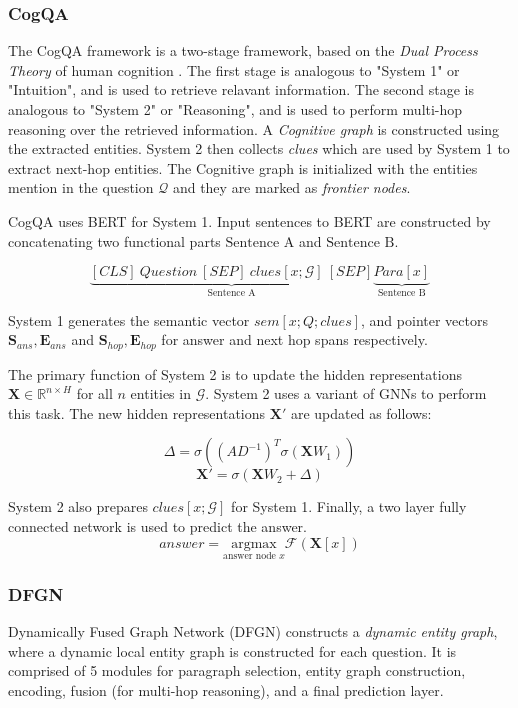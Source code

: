 \documentclass[sigplan,screen]{acmart}
\begin{document}
\subsubsection{CogQA}
The CogQA framework \cite{RN118} is a two-stage framework, based on the \emph{Dual Process Theory} of human cognition \cite{RN137}.
The first stage is analogous to "System 1" or "Intuition", and is used to retrieve relavant information. The second stage is analogous to
"System 2" or "Reasoning", and is used to perform multi-hop reasoning over the retrieved information. A \emph{Cognitive graph} is constructed
using the extracted entities. System 2 then collects \emph{clues} which are used by System 1 to extract next-hop entities.
The Cognitive graph is initialized with the entities mention in the question $\mathcal{Q}$ and they are marked as \emph{frontier nodes}.

CogQA uses BERT \cite{RN153} for System 1. Input sentences to BERT are constructed by concatenating two functional parts 
$\text{Sentence A}$ and $\text{Sentence B}$.

$$
\underbrace{{[CLS]\: Question \: [SEP]\: clues[x; \mathcal{G}]\: [SEP]}}_{\text{Sentence A}} \underbrace{{Para[x]}}_{\text{Sentence B}}
$$

System 1 generates the semantic vector $sem[x; Q; clues]$, and pointer vectors 
$\boldsymbol{S}_{ans} , \boldsymbol{E}_{ans} $ and $\boldsymbol{S}_{hop} , \boldsymbol{E}_{hop} $ for answer and next hop spans respectively.

The primary function of System 2 is to update the hidden representations $\boldsymbol{X} \in \mathbb{R}^{n \times H}$ for all $n$ entities 
in $\mathcal{G}$. System 2 uses a variant of GNNs \cite{RN2} to perform this task. The new hidden representations $\boldsymbol{X'}$ are updated 
as follows:

$$
\Delta = \sigma((AD^{-1})^T \sigma (\boldsymbol{X}W_1))
$$
$$
\boldsymbol{X'} = \sigma(\boldsymbol{X}W_2 + \Delta)
$$

System 2 also prepares $clues[x; \mathcal{G}]$ for System 1. Finally, a two layer fully connected network is used to predict the answer.
$$
answer = \underset{\text{answer node }x}{\mathrm{argmax}}  \mathcal{F}(\boldsymbol{X}[x])
$$

\subsubsection{DFGN}
Dynamically Fused Graph Network (DFGN) \cite{RN122} constructs a \emph{dynamic entity graph}, where a dynamic local entity graph is 
constructed for each question. It is comprised of 5 modules for paragraph selection, entity graph construction, encoding, fusion 
(for multi-hop reasoning), and a final prediction layer.
\end{document}
